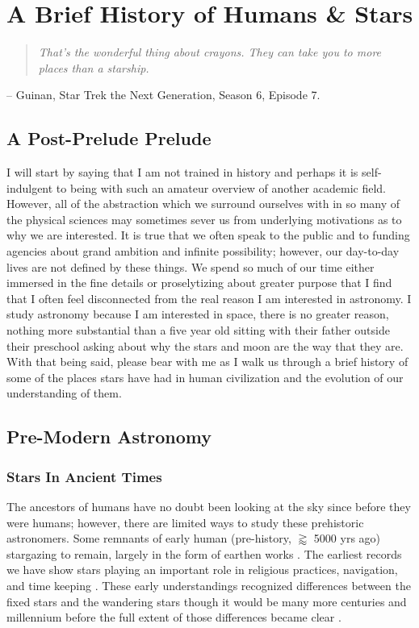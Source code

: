 \chapter{A Brief History of Humans \& Stars}
\begin{quote}\em
  That's the wonderful thing about crayons. They can take you to more places than a starship.
\end{quote}
\begin{flushright}
-- Guinan, Star Trek the Next Generation, Season 6, Episode 7.
\end{flushright}
\section{A Post-Prelude Prelude}
I will start by saying that I am not trained in history and perhaps it is
self-indulgent to being with such an amateur overview of another academic
field. However, all of the abstraction which we surround ourselves with in so
many of the physical sciences may sometimes sever us from underlying
motivations as to why we are interested. It is true that we often speak to the
public and to funding agencies about grand ambition and infinite possibility;
however, our day-to-day lives are not defined by these things. We spend so much
of our time either immersed in the fine details or proselytizing about greater
purpose that I find that I often feel disconnected from the real reason I am
interested in astronomy. I study astronomy because I am interested in space,
there is no greater reason, nothing more substantial than a five year old
sitting with their father outside their preschool asking about why the stars
and moon are the way that they are. With that being said, please bear with me
as I walk us through a brief history of some of the places stars have had in
human civilization and the evolution of our understanding of them.

\section{Pre-Modern Astronomy}
\subsection{Stars In Ancient Times}
The ancestors of humans have no doubt been looking at the sky since before they
were humans; however, there are limited ways to study these prehistoric
astronomers. Some remnants of early human (pre-history, $\gtrapprox$ 5000 yrs
ago) stargazing to remain, largely in the form of earthen works
\citep{Ouzounian1984, Benferfour2009}. The earliest records we have show stars
playing an important role in religious practices, navigation, and time keeping
\citep{Arnold1894, Evans1998, Kelley2005, Hannah2015}. These early
understandings recognized differences between the fixed stars and the wandering
stars though it would be many more centuries and millennium before the full
extent of those differences became clear \citep{Kasak2001, Tarnas2009,
Cullen2011, Leicht2011, Quack2019}.

